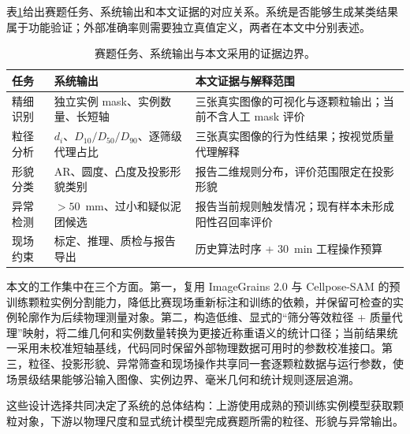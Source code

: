 表\ref{tab:r-task-map}给出赛题任务、系统输出和本文证据的对应关系。系统是否能够生成某类结果属于功能验证；外部准确率则需要独立真值定义，两者在本文中分别表述。

\begin{table}[t]
\centering
\caption{赛题任务、系统输出与本文采用的证据边界。}
\label{tab:r-task-map}
\footnotesize
\renewcommand{\arraystretch}{1.12}
\begin{tabular}{>{\raggedright\arraybackslash}p{2.0cm}>{\raggedright\arraybackslash}p{5.2cm}>{\raggedright\arraybackslash}p{6.2cm}}
\toprule
任务 & 系统输出 & 本文证据与解释范围 \\
\midrule
精细识别 & 独立实例 mask、实例数量、长短轴 & 三张真实图像的可视化与逐颗粒输出；当前不含人工 mask 评价 \\
粒径分析 & $d_i$、$D_{10}/D_{50}/D_{90}$、逐筛级代理占比 & 三张真实图像的行为性结果；按视觉质量代理解释 \\
形貌分类 & AR、圆度、凸度及投影形貌类别 & 报告二维规则分布，评价范围限定在投影形貌 \\
异常检测 & $>50$~mm、过小和疑似泥团候选 & 报告当前规则触发情况；现有样本未形成阳性召回率评价 \\
现场约束 & 标定、推理、质检与报告导出 & 历史算法时序 + 30~min 工程操作预算 \\
\bottomrule
\end{tabular}
\end{table}

本文的工作集中在三个方面。第一，复用 ImageGrains 2.0\cite{mair2026imagegrains2} 与 Cellpose-SAM\cite{pachitariu2025cellposeSAM} 的预训练颗粒实例分割能力，降低比赛现场重新标注和训练的依赖，并保留可检查的实例轮廓作为后续物理测量对象。第二，构造低维、显式的“筛分等效粒径 + 质量代理”映射，将二维几何和实例数量转换为更接近称重语义的统计口径；当前结果统一采用未校准短轴基线，代码同时保留外部物理数据可用时的参数校准接口。第三，粒径、投影形貌、异常筛查和现场操作共享同一套逐颗粒数据与运行参数，使场景级结果能够沿输入图像、实例边界、毫米几何和统计规则逐层追溯。

这些设计选择共同决定了系统的总体结构：上游使用成熟的预训练实例模型获取颗粒对象，下游以物理尺度和显式统计模型完成赛题所需的粒径、形貌与异常输出。